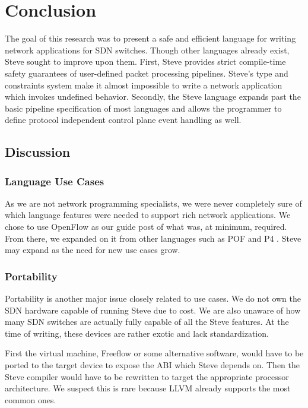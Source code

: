 \chapter{ Conclusion} \label{ch:conclusion}

The goal of this research was to present a safe and efficient language for writing network applications for SDN switches. Though other languages already exist, Steve sought to improve upon them. First, Steve provides strict compile-time safety guarantees of user-defined packet processing pipelines.
Steve's type and constraints system make it almost impossible to write a network application which invokes undefined behavior.
Secondly, the Steve language expands past the basic pipeline specification of most languages and allows the programmer to define protocol independent control plane event handling as well.

\section{Discussion}

\subsection{Language Use Cases}

As we are not network programming specialists, we were never completely sure of which language features were needed to support rich network applications. We chose to use OpenFlow as our guide post of what was, at minimum, required. From there, we expanded on it from other languages such as POF and P4 \cite{pof, p42014, p4_spec}. Steve may expand as the need for new use cases grow.

\subsection{Portability}

Portability is another major issue closely related to use cases. We do not own the SDN hardware capable of running Steve due to cost. We are also unaware of how many SDN switches are actually fully capable of all the Steve features. At the time of writing, these devices are rather exotic and lack standardization.

First the virtual machine, Freeflow \cite{freeflow_software} or some alternative software, would have to be ported to the target device to expose the ABI which Steve depends on. Then the Steve compiler would have to be rewritten to target the appropriate processor architecture. We suspect this is rare because LLVM already supports the most common ones.

